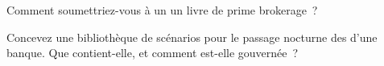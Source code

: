 \begin{interviewq}\label{iq:rc:stress-testing-and-scenarios:5}
Comment soumettriez-vous à un  un livre de prime brokerage~?
\end{interviewq}

\begin{interviewq}\label{iq:rc:stress-testing-and-scenarios:6}
Concevez une bibliothèque de scénarios pour le passage nocturne des  d'une banque. Que contient-elle, et comment est-elle
gouvernée~?
\end{interviewq}
